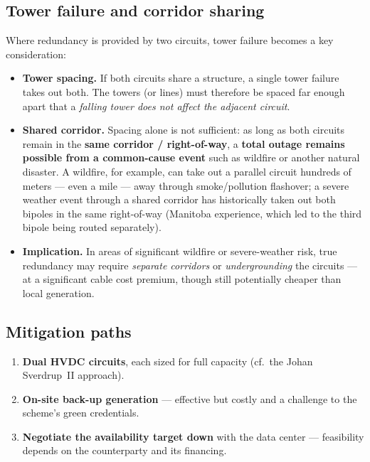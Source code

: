 \subsection{Tower failure and corridor sharing}
Where redundancy is provided by two circuits, tower failure becomes a key
consideration:
\begin{itemize}\setlength{\itemsep}{0.25em}
  \item \textbf{Tower spacing.} If both circuits share a structure, a single
        tower failure takes out both. The towers (or lines) must therefore be
        spaced far enough apart that a \emph{falling tower does not affect the
        adjacent circuit}.
  \item \textbf{Shared corridor.} Spacing alone is not sufficient: as long as
        both circuits remain in the \textbf{same corridor / right-of-way}, a
        \textbf{total outage remains possible from a common-cause event} such as
        wildfire or another natural disaster. A wildfire, for example, can take
        out a parallel circuit hundreds of meters --- even a mile --- away
        through smoke/pollution flashover; a severe weather event through a shared corridor
        has historically taken out both bipoles in the same right-of-way
        (Manitoba experience, which led to the third bipole being routed
        separately).
  \item \textbf{Implication.} In areas of significant wildfire or severe-weather
        risk, true redundancy may require \emph{separate corridors} or
        \emph{undergrounding} the circuits --- at a significant cable cost
        premium, though still potentially cheaper than local generation.
\end{itemize}

\subsection{Mitigation paths}
\begin{enumerate}\setlength{\itemsep}{0.2em}
  \item \textbf{Dual HVDC circuits}, each sized for full capacity (cf.\ the
        Johan Sverdrup~II approach).
  \item \textbf{On-site back-up generation} --- effective but costly and a
        challenge to the scheme's green credentials.
  \item \textbf{Negotiate the availability target down} with the data center ---
        feasibility depends on the counterparty and its financing.
\end{enumerate}


